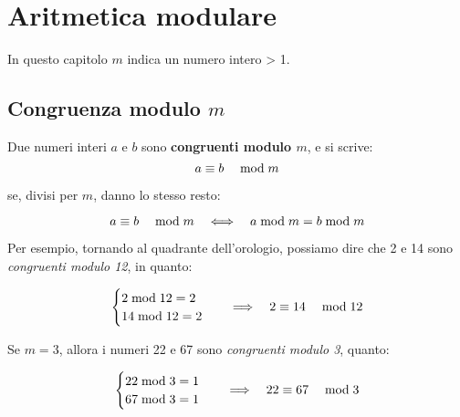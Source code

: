 \chapter{Aritmetica modulare}

In questo capitolo $m$ indica un numero intero > 1.

\section{Congruenza modulo $m$}

    \begin{definizione}
        Due numeri interi $a$ e $b$ sono \textbf{congruenti modulo $m$}, e si scrive:
        \begin{equation}
             a \equiv b \quad\bmod m 
        \end{equation}
        
        se, divisi per $m$, danno lo stesso resto:
    
        \begin{equation}
            \label{eq:def_congruenza}  a \equiv b \quad\bmod m   \quad\Longleftrightarrow\quad  a  \bmod  m = b  \bmod  m
        \end{equation}
    
    \end{definizione}

Per esempio, tornando al quadrante dell'orologio, possiamo dire che 2 e 14 sono \emph{congruenti modulo 12}, in quanto:

\begin{equation*}
    \begin{cases}
        2  \bmod  12 = 2 \\
        14  \bmod  12 = 2
    \end{cases}
    \quad\Longrightarrow\quad
     2 \equiv 14 \quad\bmod 12 
\end{equation*}

Se $m = 3$, allora i numeri 22 e 67 sono \emph{congruenti modulo 3}, quanto:

\begin{equation*}
    \begin{cases}
        22  \bmod  3 = 1 \\
        67  \bmod  3 = 1
    \end{cases}
    \quad\Longrightarrow\quad
     22 \equiv 67 \quad\bmod 3 
\end{equation*}

